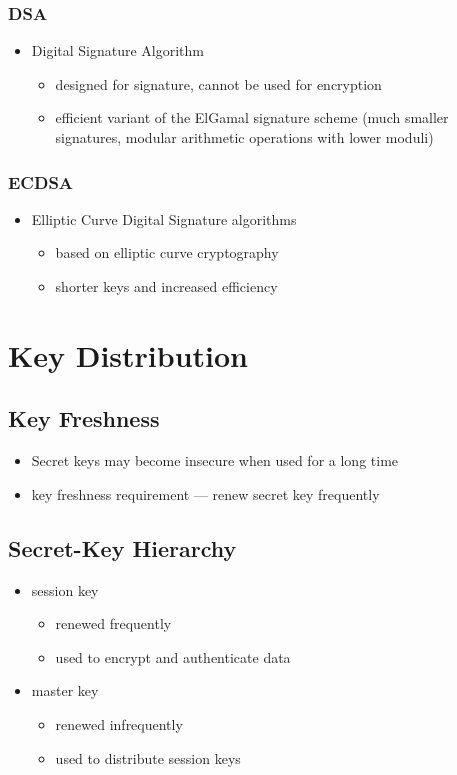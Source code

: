 \documentclass[final]{article}
\begin{document}
\subsubsection*{DSA}
\begin{itemize}[nosep]
    \item Digital Signature Algorithm
          \begin{itemize}[nosep]
              \item designed for signature, cannot be used for encryption
              \item efficient variant of the ElGamal signature scheme (much smaller signatures, modular arithmetic operations with lower moduli)
          \end{itemize}
\end{itemize}
\subsubsection*{ECDSA}
\begin{itemize}
    \item Elliptic Curve Digital Signature algorithms
          \begin{itemize}[nosep]
              \item based on elliptic curve cryptography
              \item shorter keys and increased efficiency
          \end{itemize}
\end{itemize}
\section{Key Distribution}
\subsection{Key Freshness}
\begin{itemize}[nosep]
    \item Secret keys may become insecure when used for a long time
    \item key freshness requirement --- renew secret key frequently
\end{itemize}
\subsection{Secret-Key Hierarchy}
\begin{itemize}[nosep]
    \item session key
          \begin{itemize}[nosep]
              \item renewed frequently
              \item used to encrypt and authenticate data
          \end{itemize}
    \item master key
          \begin{itemize}[nosep]
              \item renewed infrequently
              \item used to distribute session keys
          \end{itemize}
\end{itemize}
\end{document}
